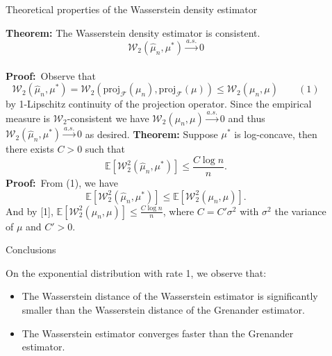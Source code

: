 \documentclass[final]{beamer}
\newlength{\sepwidth}
\newlength{\colwidth}
\newcommand{\separatorcolumn}{\begin{column}{\sepwidth}\end{column}}
\begin{document}
\begin{frame}[t]
\begin{columns}[t]
\begin{column}{\colwidth}
\end{column}

\separatorcolumn

\begin{column}{\colwidth}

  \begin{exampleblock}{Theoretical properties of the Wasserstein density estimator}

\noindent\textbf{Theorem:} The Wasserstein density estimator is consistent.\\[0.5em]
\[
\mathcal{W}_2(\hat{\mu}_n, \mu^*) \xrightarrow{a.s.} 0
\]\\[0.5em]

\noindent\textbf{Proof:}\, 
Observe that \[
\mathcal{W}_2(\hat{\mu}_n, \mu^*) = \mathcal{W}_2\left( \mathrm{proj}_{\mathcal{F}}(\mu_n), \mathrm{proj}_{\mathcal{F}}(\mu) \right) \leq \mathcal{W}_2(\mu_n, \mu) \hspace{2em} (1)
\] by 1-Lipschitz continuity of the projection operator. Since the empirical measure is $\mathcal{W}_2$-consistent we have $\mathcal{W}_2(\mu_n, \mu) \xrightarrow{a.s.} 0$ and thus $\mathcal{W}_2(\hat{\mu}_n, \mu^*) \xrightarrow{a.s.} 0$ as desired.\vspace{1cm}
\noindent\textbf{Theorem:} Suppose $\mu^*$ is log-concave, then there exists $C > 0$ such that\\[0.5em]
\[
\mathbb{E}\left[ \mathcal{W}_2^2(\hat{\mu}_n, \mu^*) \right] \leq \frac{C  \log n}{n}.
\]
\noindent\textbf{Proof:}\, 
From (1), we have 
\[
\mathbb{E}\left[ \mathcal{W}_2^2(\hat{\mu}_n, \mu^*) \right] \leq \mathbb{E}\left[ \mathcal{W}_2^2(\mu_n, \mu) \right].
\]
And by [1], $\mathbb{E}\left[ \mathcal{W}_2^2(\mu_n, \mu) \right] \leq \frac{C \log n}{n}$, where $C = C'\sigma^2$ with $\sigma^2$ the variance of $\mu$ and $C' > 0$.




\end{exampleblock}

  \begin{block}{Conclusions}

     On the exponential distribution with rate 1, we observe that:
     \begin{itemize}
         \item The Wasserstein distance of the Wasserstein estimator is significantly smaller than the Wasserstein distance of the Grenander estimator.
         \item The Wasserstein estimator converges faster than the Grenander estimator.
     \end{itemize}
     

\end{block}
\end{column}
\end{columns}
\end{frame}
\end{document}
